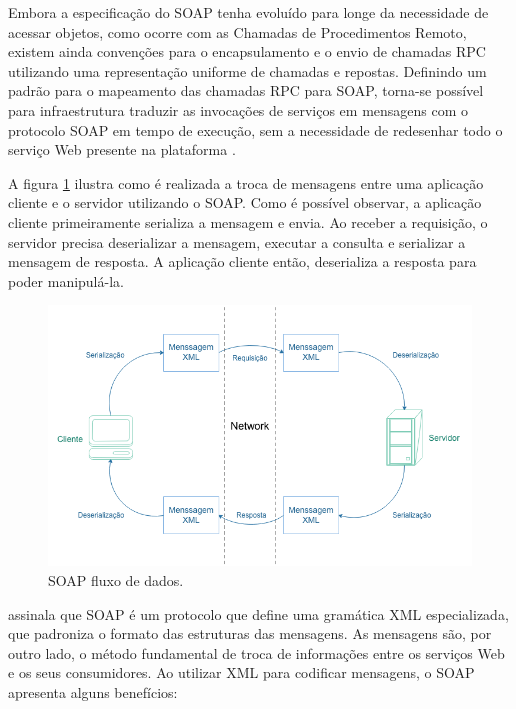 Embora a especificação do SOAP tenha evoluído para longe da necessidade de acessar objetos, como ocorre com as Chamadas de Procedimentos Remoto, existem ainda convenções para o encapsulamento e o envio de chamadas RPC utilizando uma representação uniforme de chamadas e repostas. Definindo um padrão para o mapeamento das chamadas RPC para SOAP, torna-se possível para infraestrutura traduzir as invocações de serviços em mensagens com o protocolo SOAP em tempo de execução, sem a necessidade de redesenhar todo o serviço Web presente na plataforma \cite{soap-microsoft}.

A figura \ref{fig:soap} ilustra como é realizada a troca de mensagens entre uma aplicação cliente e o servidor utilizando o SOAP. Como é possível observar, a aplicação cliente primeiramente serializa a mensagem e envia. Ao receber a requisição, o servidor precisa deserializar a mensagem, executar a consulta e serializar a mensagem de resposta. A aplicação cliente então, deserializa a resposta para poder manipulá-la.

\begin{figure}[htbp]
\centering
\includegraphics[width=1\textwidth]{figuras/soap.png}
\caption{SOAP fluxo de dados.}
\label{fig:soap}
\author{https://msdn.microsoft.com/en-us/library/x05s00wz(v=vs.80).aspx}
\end{figure}

 assinala que SOAP é um protocolo que define uma gramática XML especializada, que padroniza o formato das estruturas das mensagens. As mensagens são, por outro lado, o método fundamental de troca de informações entre os serviços Web e os seus consumidores. Ao utilizar XML para codificar mensagens,  o SOAP apresenta alguns benefícios:

